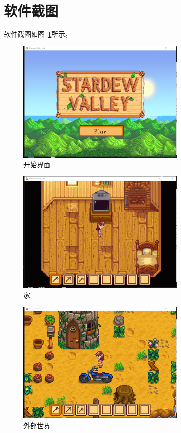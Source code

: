 \documentclass[a4paper,12pt]{report}
\begin{document}
\section{软件截图}
\songti
\begin{spacing}{1.5}
软件截图如图~\ref{pic1}所示。

\begin{figure}[H]
  \centering
\includegraphics[width=3.3in]{3.png}\caption{开始界面}\label{pic1}
\end{figure}

\begin{figure}[H]
  \centering
\includegraphics[width=3.3in]{4.png}\caption{家}\label{pic2}
\end{figure}

\begin{figure}[H]
  \centering
\includegraphics[width=3.3in]{2.png}\caption{外部世界}\label{pic2}
\end{figure}


\end{spacing}
\end{document}
